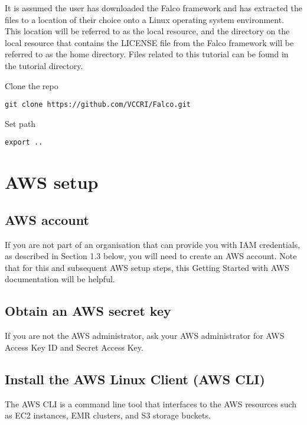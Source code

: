 \documentclass[]{book}
\begin{document}
It is assumed the user has downloaded the Falco framework and has extracted the files to a location of their choice onto a Linux operating system environment. This location will be referred to as the local resource, and the directory on the local resource that contains the LICENSE file from the Falco framework will be referred to as the home directory. Files related to this tutorial can be found in the tutorial directory.

Clone the repo

\begin{verbatim}
git clone https://github.com/VCCRI/Falco.git
\end{verbatim}

Set path

\begin{verbatim}
export ..
\end{verbatim}

\hypertarget{aws-setup}{%
\section{AWS setup}\label{aws-setup}}

\hypertarget{aws-account}{%
\subsection{AWS account}\label{aws-account}}

If you are not part of an organisation that can provide you with IAM credentials, as described in Section 1.3 below, you will need to create an AWS account. Note that for this and subsequent AWS setup steps, this Getting Started with AWS documentation will be helpful.

\hypertarget{obtain-an-aws-secret-key}{%
\subsection{Obtain an AWS secret key}\label{obtain-an-aws-secret-key}}

If you are not the AWS administrator, ask your AWS administrator for AWS Access Key ID and Secret Access Key.

\hypertarget{install-the-aws-linux-client-aws-cli}{%
\subsection{Install the AWS Linux Client (AWS CLI)}\label{install-the-aws-linux-client-aws-cli}}

The AWS CLI is a command line tool that interfaces to the AWS resources such as EC2 instances, EMR clusters, and S3 storage buckets.
\end{document}
